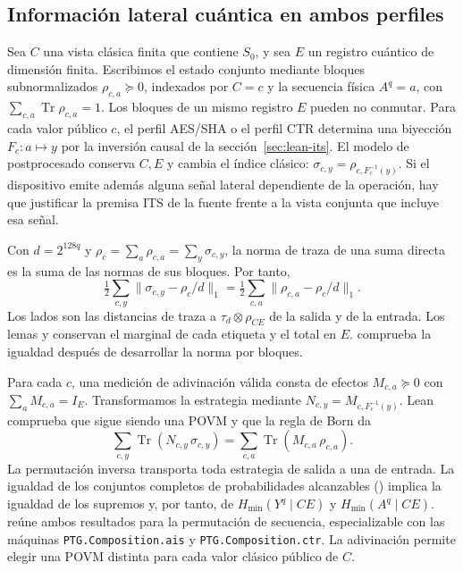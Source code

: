 \subsection{Información lateral cuántica en ambos perfiles}
\label{sec:lean-cq}
Sea \(C\) una vista clásica finita que contiene \(S_0\), y sea \(E\)
un registro cuántico de dimensión finita. Escribimos el estado conjunto mediante
bloques subnormalizados \(\rho_{c,a}\succeq0\), indexados por \(C=c\) y la
secuencia física \(A^q=a\), con \(\sum_{c,a}\operatorname{Tr}\rho_{c,a}=1\).
Los bloques de un mismo registro \(E\) pueden no conmutar. Para cada valor
público \(c\), el perfil AES/SHA o el perfil CTR determina una biyección
\(F_c:a\mapsto y\) por la inversión causal de la sección~\ref{sec:lean-its}.
El modelo de postprocesado conserva \(C,E\) y cambia el índice clásico:
\(\sigma_{c,y}=\rho_{c,F_c^{-1}(y)}\). Si el dispositivo emite además alguna
señal lateral dependiente de la operación, hay que justificar la premisa ITS de la
fuente frente a la vista conjunta que incluye esa señal.

Con \(d=2^{128q}\) y \(\rho_c=\sum_a\rho_{c,a}=\sum_y\sigma_{c,y}\),
la norma de traza de una suma directa es la suma de las normas de sus bloques.
Por tanto,
\[
 \tfrac12\sum_{c,y}\lVert\sigma_{c,y}-\rho_c/d\rVert_1
  =\tfrac12\sum_{c,a}\lVert\rho_{c,a}-\rho_c/d\rVert_1 .
\]
Los lados son las distancias de traza a \(\tau_d\otimes\rho_{CE}\) de la
salida y de la entrada. Los lemas  y
 conservan el marginal de cada etiqueta y el total en \(E\).  comprueba la igualdad
después de desarrollar la norma por bloques.

Para cada \(c\), una medición de adivinación válida consta de efectos
\(M_{c,a}\succeq0\) con \(\sum_a M_{c,a}=I_E\).
Transformamos la estrategia mediante \(N_{c,y}=M_{c,F_c^{-1}(y)}\).
Lean comprueba que sigue siendo una POVM y que la regla de Born da
\[
 \sum_{c,y}\operatorname{Tr}(N_{c,y}\,\sigma_{c,y})
   =\sum_{c,a}\operatorname{Tr}(M_{c,a}\,\rho_{c,a}).
\]
La permutación inversa transporta toda estrategia de salida a una de entrada.
La igualdad de los conjuntos completos de probabilidades alcanzables
() implica la igualdad de los supremos y, por
tanto, de \(H_{\min}(Y^q\mid CE)\) y \(H_{\min}(A^q\mid CE)\).
 reúne ambos resultados para la permutación
de secuencia, especializable con las máquinas \texttt{PTG.Composition.ais}
y \texttt{PTG.Composition.ctr}. La adivinación permite elegir una POVM
distinta para cada valor clásico público de \(C\).

